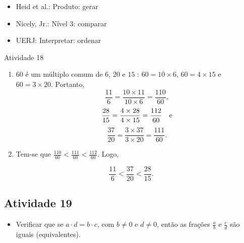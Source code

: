 \begin{multicols}{2}
  
   \vspace{.1cm}
  
 \vspace{.1cm}
   
\begin{itemize} %
    \item       Heid et al.: Produto: gerar
    \item       Nicely, Jr.: Nível 3: comparar
    \item       UERJ: Interpretar: ordenar
\end{itemize} %

 \vspace*{\fill}
\columnbreak

\begin{resposta*}{Atividade 18}
\begin{enumerate} [\quad a)] %
    \item             $60$       é um múltiplo comum de       $6$,       $20$    
   e       $15$      :       $60 = 10 \times 6$,       $60 = 4 \times 15$       
e       $60 = 3 \times 20$. Portanto,       $$\frac{11}{6} = \frac{10 \times 
11}{10 \times 6} = \frac{110}{60},$$             $$\frac{28}{15} = \frac{4 
\times 28}{4 \times 15} = \frac{112}{60} \quad {\rm  e}$$             
$$\frac{37}{20} = \frac{3 \times 37}{3 \times 20} = \frac{111}{60}.$$      
\mbox{} \newline 
    \item       Tem-se que       $\frac{110}{60} < \frac{111}{60} < 
\frac{112}{60}$. Logo,
\end{enumerate} %
  
  $$\frac{11}{6} < \frac{37}{20} < \frac{28}{15}.$$  
\end{resposta*}

\subsection{Atividade 19}

\begin{itemize} %
    \item       Verificar que se       $a \cdot d = b \cdot c$, com       $b 
\not = 0$       e       $d \not = 0$, então as frações       $\frac{a}{b}$       
e       $\frac{c}{d}$       são iguais (equivalentes).
\end{itemize} %
  
  
 

\end{multicols}
